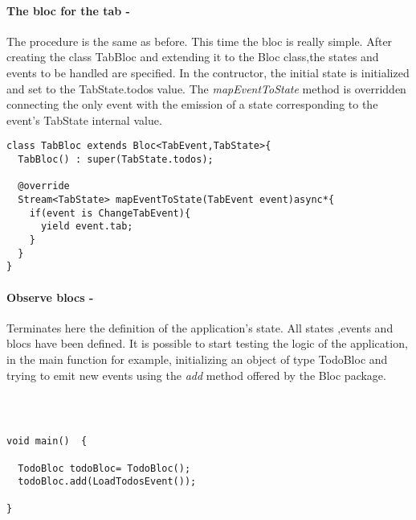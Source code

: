 \paragraph{The bloc for the tab - }
\label{subpar:todo_app_bloc_core_state}

The procedure is the same as before. This time the bloc is really simple.  After creating the class TabBloc and extending it to the Bloc class,the states and events to be handled are specified.  In the contructor, the initial state is initialized and set to the TabState.todos value. The \textit{mapEventToState} method is overridden connecting the only event with the emission of a state corresponding to the event's TabState internal value.

\begin{code}
\mbox{}
 \mbox{}
\label{code:2.14}
\begin{verbatim}
class TabBloc extends Bloc<TabEvent,TabState>{
  TabBloc() : super(TabState.todos);

  @override
  Stream<TabState> mapEventToState(TabEvent event)async*{
    if(event is ChangeTabEvent){
      yield event.tab;
    }
  }
}
\end{verbatim}
\mbox{}
\end{code}
\paragraph{Observe blocs - }
\label{subpar:todo_app_bloc_core_state}

Terminates here the definition of the application’s state. All states ,events and blocs have been defined. It is possible to start testing the logic of the application, in the main function for example, initializing an object of type TodoBloc and trying to emit new events using the \textit{add} method offered by the Bloc package.
\begin{code}
\mbox{}\\
 \mbox{}
\label{code:2.14}
\begin{verbatim}

void main()  {
  
  TodoBloc todoBloc= TodoBloc();
  todoBloc.add(LoadTodosEvent());
  
}
\end{verbatim}
\mbox{}
\end{code}

